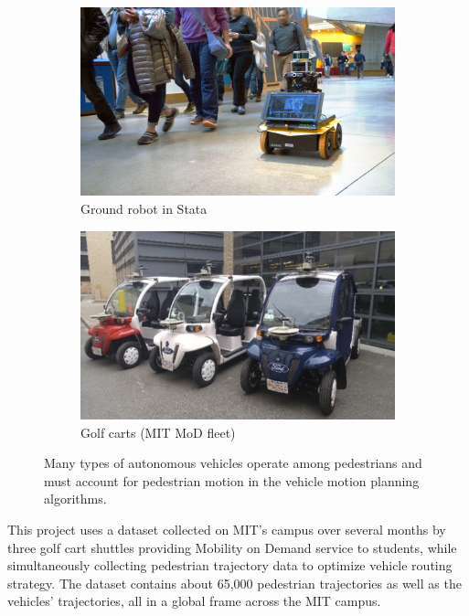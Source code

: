 \begin{figure}
\centering
\begin{subfigure}{.25\textwidth}
  \centering
  \includegraphics[width=.9\linewidth]{figures/rover_d}
  \caption{Ground robot in Stata}
  \label{fig:jackal}
\end{subfigure}%
\begin{subfigure}{.25\textwidth}
  \centering
  \includegraphics[width=.9\linewidth]{figures/mod_testbed}
  \caption{Golf carts (MIT MoD fleet)}
  \label{fig:golf_carts}
\end{subfigure}
\caption{Many types of autonomous vehicles operate among pedestrians and must account for pedestrian motion in the vehicle motion planning algorithms.}
\label{fig:vehicles}
\end{figure}

This project uses a dataset collected on MIT's campus over several months by three golf cart shuttles providing Mobility on Demand service to students, while simultaneously collecting pedestrian trajectory data to optimize vehicle routing strategy.
The dataset contains about 65,000 pedestrian trajectories as well as the vehicles' trajectories, all in a global frame across the MIT campus.

